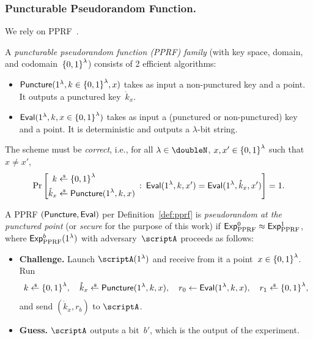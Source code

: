 \subsubsection{Puncturable Pseudorandom Function.}
We rely on PPRF~\cite{AC:BonWat13,CCS:KPTZ13,PKC:BoyGolIva14,STOC:SahWat14}.

\begin{definition}\label{def:pprf}
A \emph{puncturable pseudorandom function (PPRF) family} (with key space, domain, and codomain~${\{0,1\}}^\lambda$) consists of 2 efficient algorithms:
\begin{itemize}
\item $\Puncture(1^\lambda,k\in\bit^\lambda,x)$
takes as input a non-punctured key and a point.
It outputs a punctured key~$\mathring{k}_x$.
\item $\Eval(1^\lambda,k,x\in\bit^\lambda)$
takes as input a (punctured or non-punctured) key and a point.
It is deterministic and outputs a $\lambda$-bit string.
\end{itemize}
The scheme must be \emph{correct}, i.e., for all
${\lambda\in\doubleN}$,
${x,x'\in{\{0,1\}}^\lambda}$ such that ${x\neq x'}$,
\begin{align*}
\Pr\left[
\begin{aligned}
k&{}\draws\bit^\lambda\\
\mathring{k}_x&{}\draws\Puncture(1^\lambda,k,x)
\end{aligned}
\::\:
\Eval(1^\lambda,k,x')
=
\Eval(1^\lambda,\mathring{k}_x,x')
\right]=1.
\end{align*}
\end{definition}

\begin{definition}\label{def:pprf-security}
A PPRF $(\Puncture,\Eval)$ per Definition~\ref{def:pprf} is \emph{pseudorandom at the punctured point} (or \emph{secure} for the purpose of this work)
if ${\ExpPPRF{0}\approx\ExpPPRF{1}}$,
where $\ExpPPRF{b}(1^\lambda)$ with adversary~$\scriptA$ proceeds as follows:
\begin{itemize}\upshape
\item\textbf{Challenge.}
Launch $\scriptA(1^\lambda)$ and receive from it a point~${x\in{\{0,1\}}^\lambda}$.
Run
\begin{align*}
\WideNarrow{}{\hspace*{-1.2em}}
k\draws\bit^\lambda,\quad
\mathring{k}_x\draws\Puncture(1^\lambda,k,x),\quad
r_0\gets\Eval(1^\lambda,k,x),\quad
r_1\draws\bit^\lambda,
\end{align*}
and send $(\mathring{k}_x,r_b)$ to $\scriptA$.
\item\textbf{Guess.}
$\scriptA$ outputs a bit~$b'$, which is the output of the experiment.
\end{itemize}
\end{definition}
